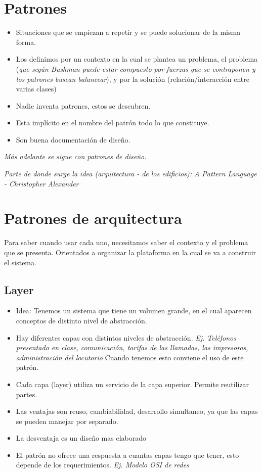 \section{Patrones}

\begin{itemize}
\item Situaciones que se empiezan a repetir y se puede solucionar de la misma forma.
\item Los definimos por un contexto en la cual se plantea un problema, el problema (\textit{que según Bushman puede estar compuesto por fuerzas que se contraponen y los patrones buscan balancear}), y por la solución (relación/interacción entre varias clases)
\item Nadie inventa patrones, estos se descubren.
\item Esta implícito en el nombre del patrón todo lo que constituye.
\item Son buena documentación de diseño.
\end{itemize}

\textit{Más adelante se sigue con patrones de diseño.}

\textit{Parte de donde surge la idea (arquitectura - de los edificios): A Pattern Language - Christopher Alexander }


\section{Patrones de arquitectura}
Para saber cuando usar cada uno, necesitamos saber el contexto y el problema que se presenta. Orientados a organizar la plataforma en la cual se va a construir el sistema.

\subsection*{Layer}

\begin{itemize}
\item Idea: Tenemos un sistema que tiene un volumen grande, en el cual aparecen conceptos de distinto nivel de abstracción.
\item Hay diferentes capas con distintos niveles de abstracción. \textit{Ej. Teléfonos presentado en clase, comunicación, tarifas de las llamadas, las impresoras, administración del locutorio} Cuando tenemos esto conviene el uso de este patrón.
\item Cada capa (layer) utiliza un servicio de la capa superior. Permite reutilizar partes.
\item Las ventajas son reuso, cambiabilidad, desarrollo simultaneo, ya que las capas se pueden manejar por separado.
\item La desventaja es un diseño mas elaborado
\item El patrón no ofrece una respuesta a cuantas capas tengo que tener, esto depende de los requerimientos. \textit{Ej. Modelo OSI de redes}
\end{itemize}

